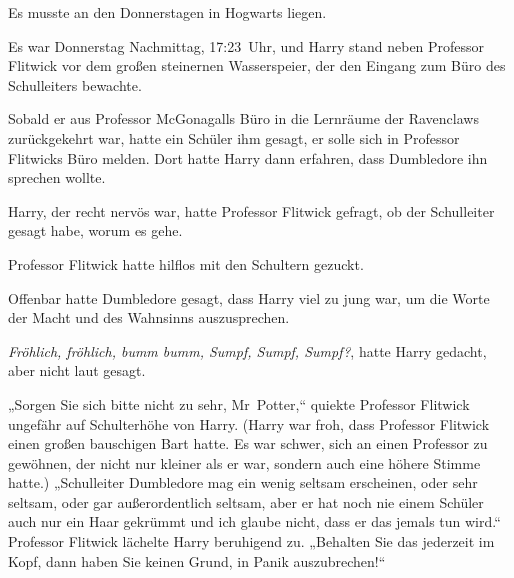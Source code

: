 Es musste an den Donnerstagen in Hogwarts liegen.

Es war Donnerstag Nachmittag, 17:23~Uhr, und Harry stand neben Professor Flitwick vor dem großen steinernen Wasserspeier, der den Eingang zum Büro des Schulleiters bewachte.

Sobald er aus Professor McGonagalls Büro in die Lernräume der Ravenclaws zurückgekehrt war, hatte ein Schüler ihm gesagt, er solle sich in Professor Flitwicks Büro melden. Dort hatte Harry dann erfahren, dass Dumbledore ihn sprechen wollte.

Harry, der recht nervös war, hatte Professor Flitwick gefragt, ob der Schulleiter gesagt habe, worum es gehe.

Professor Flitwick hatte hilflos mit den Schultern gezuckt.

Offenbar hatte Dumbledore gesagt, dass Harry viel zu jung war, um die Worte der Macht und des Wahnsinns auszusprechen.

\emph{Fröhlich, fröhlich, bumm bumm, Sumpf, Sumpf, Sumpf?}, hatte Harry gedacht, aber nicht laut gesagt.

„Sorgen Sie sich bitte nicht zu sehr, Mr~Potter,“ quiekte Professor Flitwick ungefähr auf Schulterhöhe von Harry. (Harry war froh, dass Professor Flitwick einen großen bauschigen Bart hatte. Es war schwer, sich an einen Professor zu gewöhnen, der nicht nur kleiner als er war, sondern auch eine höhere Stimme hatte.) „Schulleiter Dumbledore mag ein wenig seltsam erscheinen, oder sehr seltsam, oder gar außerordentlich seltsam, aber er hat noch nie einem Schüler auch nur ein Haar gekrümmt und ich glaube nicht, dass er das jemals tun wird.“ Professor Flitwick lächelte Harry beruhigend zu. „Behalten Sie das jederzeit im Kopf, dann haben Sie keinen Grund, in Panik auszubrechen!“

